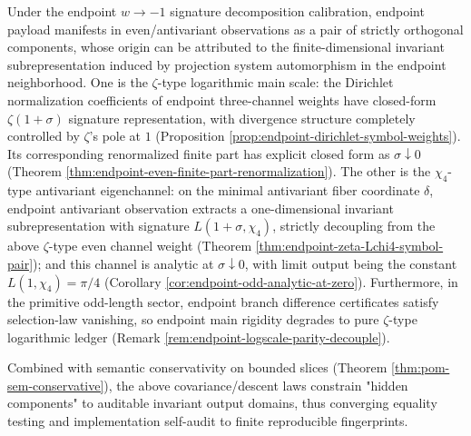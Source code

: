 \begin{remark}\label{rem:endpoint-obstruction-dichotomy}
Under the endpoint \(w\to-1\) signature decomposition calibration, endpoint payload manifests in even/antivariant observations as a pair of strictly orthogonal components, whose origin can be attributed to the finite-dimensional invariant subrepresentation induced by projection system automorphism in the endpoint neighborhood.
One is the \(\zeta\)-type logarithmic main scale: the Dirichlet normalization coefficients of endpoint three-channel weights have closed-form \(\zeta(1+\sigma)\) signature representation, with divergence structure completely controlled by \(\zeta\)'s pole at \(1\) (Proposition \ref{prop:endpoint-dirichlet-symbol-weights}).
Its corresponding renormalized finite part has explicit closed form as \(\sigma\downarrow 0\) (Theorem \ref{thm:endpoint-even-finite-part-renormalization}).
The other is the \(\chi_4\)-type antivariant eigenchannel: on the minimal antivariant fiber coordinate \(\delta\), endpoint antivariant observation extracts a one-dimensional invariant subrepresentation with signature \(L(1+\sigma,\chi_4)\), strictly decoupling from the above \(\zeta\)-type even channel weight (Theorem \ref{thm:endpoint-zeta-Lchi4-symbol-pair}); and this channel is analytic at \(\sigma\downarrow 0\), with limit output being the constant \(L(1,\chi_4)=\pi/4\) (Corollary \ref{cor:endpoint-odd-analytic-at-zero}).
Furthermore, in the primitive odd-length sector, endpoint branch difference certificates satisfy selection-law vanishing, so endpoint main rigidity degrades to pure \(\zeta\)-type logarithmic ledger (Remark \ref{rem:endpoint-logscale-parity-decouple}).
\end{remark}
Combined with semantic conservativity on bounded slices (Theorem \ref{thm:pom-sem-conservative}), the above covariance/descent laws constrain "hidden components" to auditable invariant output domains, thus converging equality testing and implementation self-audit to finite reproducible fingerprints.

